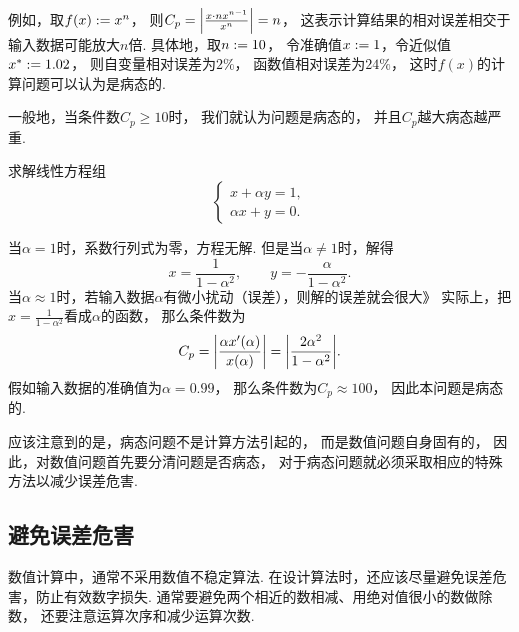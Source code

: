 例如，取\(f(x) := x^n\)，
则\(C_p = \abs{\frac{x \cdot n x^{n-1}}{x^n}} = n\)，
这表示计算结果的相对误差相交于输入数据可能放大\(n\)倍.
具体地，取\(n := 10\)，
令准确值\(x := 1\)，令近似值\(x^* := 1.02\)，
则自变量相对误差为\(2\%\)，
函数值相对误差为\(24\%\)，
这时\(f(x)\)的计算问题可以认为是病态的.

一般地，当条件数\(C_p \geq 10\)时，
我们就认为问题是病态的，
并且\(C_p\)越大病态越严重.

\begin{example}

求解线性方程组\begin{equation*}
	\begin{cases}
		x + \alpha y = 1, \\
		\alpha x + y = 0.
	\end{cases}
\end{equation*}
\begin{solution}
当\(\alpha = 1\)时，系数行列式为零，方程无解.
但是当\(\alpha \neq 1\)时，解得\begin{equation*}
	x = \frac{1}{1-\alpha^2},
	\qquad
	y = -\frac{\alpha}{1-\alpha^2}.
\end{equation*}
当\(\alpha \approx 1\)时，若输入数据\(\alpha\)有微小扰动（误差），则解的误差就会很大》
实际上，把\(x = \frac{1}{1-\alpha^2}\)看成\(\alpha\)的函数，
那么条件数为\begin{equation*}
	C_p = \abs{\frac{\alpha x'(\alpha)}{x(\alpha)}}
	= \abs{\frac{2\alpha^2}{1-\alpha^2}}.
\end{equation*}
假如输入数据的准确值为\(\alpha = 0.99\)，
那么条件数为\(C_p \approx 100\)，
因此本问题是病态的.
\end{solution}
\end{example}

应该注意到的是，病态问题不是计算方法引起的，
而是数值问题自身固有的，
因此，对数值问题首先要分清问题是否病态，
对于病态问题就必须采取相应的特殊方法以减少误差危害.

\subsection{避免误差危害}
数值计算中，通常不采用数值不稳定算法.
在设计算法时，还应该尽量避免误差危害，防止有效数字损失.
通常要避免两个相近的数相减、用绝对值很小的数做除数，
还要注意运算次序和减少运算次数.
